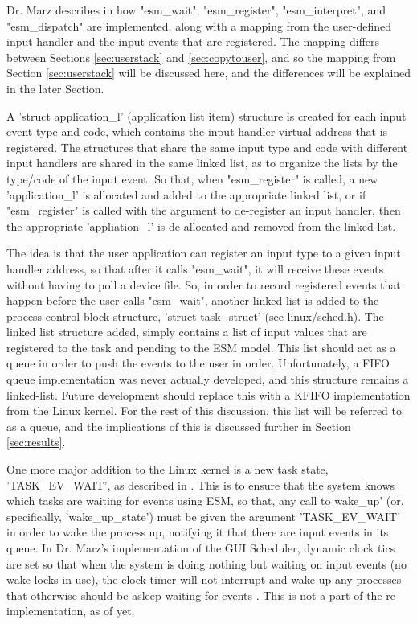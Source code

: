 \documentclass[10pt,journal,compsoc]{IEEEtran}
\begin{document}
Dr. Marz describes in \cite{Marz_BVZ_ESM} how "esm\_wait", "esm\_register", "esm\_interpret", and "esm\_dispatch" are implemented, along with a mapping from the user-defined input handler and the input events that are registered. The mapping differs between Sections \ref{sec:userstack} and \ref{sec:copytouser}, and so the mapping from Section \ref{sec:userstack} will be discussed here, and the differences will be explained in the later Section.

A 'struct application\_l' (application list item) structure is created for each input event type and code, which contains the input handler virtual address that is registered. The structures that share the same input type and code with different input handlers are shared in the same linked list, as to organize the lists by the type/code of the input event. So that, when "esm\_register" is called, a new 'application\_l' is allocated and added to the appropriate linked list, or if "esm\_register" is called with the argument to de-register an input handler, then the appropriate 'appliation\_l' is de-allocated and removed from the linked list.

The idea is that the user application can register an input type to a given input handler address, so that after it calls "esm\_wait", it will receive these events without having to poll a device file. So, in order to record registered events that happen before the user calls "esm\_wait", another linked list is added to the process control block structure, 'struct task\_struct' (see linux/sched.h). The linked list structure added, simply contains a list of input values that are registered to the task and pending to the ESM model. This list should act as a queue in order to push the events to the user in order. Unfortunately, a FIFO queue implementation was never actually developed, and this structure remains a linked-list. Future development should replace this with a KFIFO implementation from the Linux kernel. For the rest of this discussion, this list will be referred to as a queue, and the implications of this is discussed further in Section \ref{sec:results}.

One more major addition to the Linux kernel is a new task state, 'TASK\_EV\_WAIT', as described in \cite{Marz_BVZ_ESM}. This is to ensure that the system knows which tasks are waiting for events using ESM, so that, any call to wake\_up' (or, specifically, 'wake\_up\_state') must be given the argument 'TASK\_EV\_WAIT' in order to wake the process up, notifying it that there are input events in its queue. In Dr. Marz's implementation of the GUI Scheduler, dynamic clock tics are set so that when the system is doing nothing but waiting on input events (no wake-locks in use), the clock timer will not interrupt and wake up any processes that otherwise should be asleep waiting for events \cite{Marz2018ReducingPC}. This is not a part of the re-implementation, as of yet.
\end{document}
